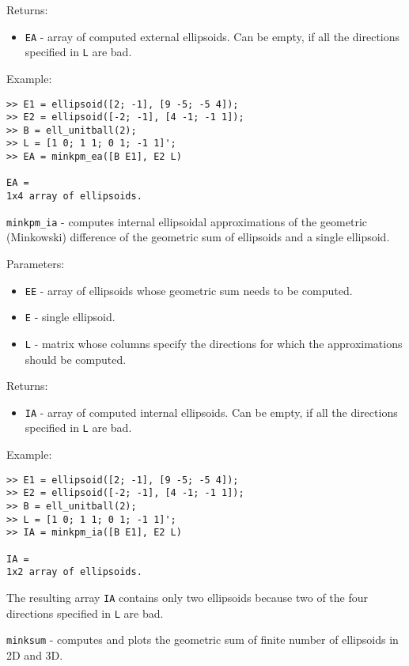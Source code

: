 Returns:
\begin{itemize}
\item {\tt EA} - array of computed external ellipsoids. Can be empty, if
all the directions specified in {\tt L} are bad.
\end{itemize}

Example:
{\tt \begin{verbatim}
>> E1 = ellipsoid([2; -1], [9 -5; -5 4]);
>> E2 = ellipsoid([-2; -1], [4 -1; -1 1]);
>> B = ell_unitball(2);
>> L = [1 0; 1 1; 0 1; -1 1]';
>> EA = minkpm_ea([B E1], E2 L)

EA =
1x4 array of ellipsoids.
\end{verbatim} }

\newpage

{\Large {\tt minkpm\_ia}} - computes internal ellipsoidal approximations
of the geometric (Minkowski) difference of the geometric sum of ellipsoids
and a single ellipsoid.

Parameters:
\begin{itemize}
\item {\tt EE} - array of ellipsoids whose geometric sum needs to be computed.
\item {\tt E} - single ellipsoid.
\item {\tt L} - matrix whose columns specify the directions for which
the approximations should be computed.
\end{itemize}

Returns:
\begin{itemize}
\item {\tt IA} - array of computed internal ellipsoids. Can be empty, if
all the directions specified in {\tt L} are bad.
\end{itemize}

Example:
{\tt \begin{verbatim}
>> E1 = ellipsoid([2; -1], [9 -5; -5 4]);
>> E2 = ellipsoid([-2; -1], [4 -1; -1 1]);
>> B = ell_unitball(2);
>> L = [1 0; 1 1; 0 1; -1 1]';
>> IA = minkpm_ia([B E1], E2 L)

IA =
1x2 array of ellipsoids.
\end{verbatim} }
The resulting array {\tt IA} contains only two ellipsoids because two
of the four directions specified in {\tt L} are bad.

\newpage

{\Large {\tt minksum}} - computes and plots the geometric sum of finite
number of ellipsoids in 2D and 3D.


